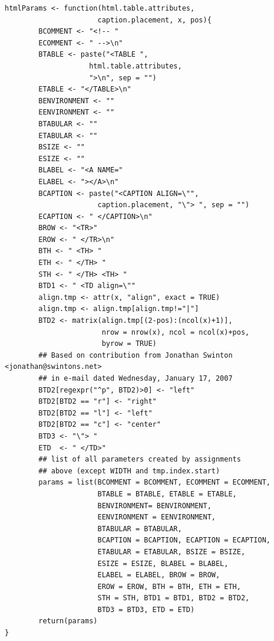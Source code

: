 \documentclass{memoir}\usepackage[]{graphicx}\usepackage[]{color}
\begin{document}
\begin{lstlisting}
htmlParams <- function(html.table.attributes, 
                      caption.placement, x, pos){
        BCOMMENT <- "<!-- "
        ECOMMENT <- " -->\n"
        BTABLE <- paste("<TABLE ", 
                    html.table.attributes, 
                    ">\n", sep = "")
        ETABLE <- "</TABLE>\n"
        BENVIRONMENT <- ""
        EENVIRONMENT <- ""
        BTABULAR <- ""
        ETABULAR <- ""
        BSIZE <- ""
        ESIZE <- ""
        BLABEL <- "<A NAME="
        ELABEL <- "></A>\n"
        BCAPTION <- paste("<CAPTION ALIGN=\"", 
                      caption.placement, "\"> ", sep = "")
        ECAPTION <- " </CAPTION>\n"
        BROW <- "<TR>"
        EROW <- " </TR>\n"
        BTH <- " <TH> "
        ETH <- " </TH> "
        STH <- " </TH> <TH> "
        BTD1 <- " <TD align=\""
        align.tmp <- attr(x, "align", exact = TRUE)
        align.tmp <- align.tmp[align.tmp!="|"]
        BTD2 <- matrix(align.tmp[(2-pos):(ncol(x)+1)],
                       nrow = nrow(x), ncol = ncol(x)+pos, 
                       byrow = TRUE)
        ## Based on contribution from Jonathan Swinton <jonathan@swintons.net>
        ## in e-mail dated Wednesday, January 17, 2007
        BTD2[regexpr("^p", BTD2)>0] <- "left"
        BTD2[BTD2 == "r"] <- "right"
        BTD2[BTD2 == "l"] <- "left"
        BTD2[BTD2 == "c"] <- "center"
        BTD3 <- "\"> "
        ETD  <- " </TD>"
        ## list of all parameters created by assignments 
        ## above (except WIDTH and tmp.index.start)
        params = list(BCOMMENT = BCOMMENT, ECOMMENT = ECOMMENT, 
                      BTABLE = BTABLE, ETABLE = ETABLE, 
                      BENVIRONMENT= BENVIRONMENT, 
                      EENVIRONMENT = EENVIRONMENT, 
                      BTABULAR = BTABULAR, 
                      BCAPTION = BCAPTION, ECAPTION = ECAPTION, 
                      ETABULAR = ETABULAR, BSIZE = BSIZE, 
                      ESIZE = ESIZE, BLABEL = BLABEL, 
                      ELABEL = ELABEL, BROW = BROW,
                      EROW = EROW, BTH = BTH, ETH = ETH,
                      STH = STH, BTD1 = BTD1, BTD2 = BTD2, 
                      BTD3 = BTD3, ETD = ETD)
        return(params)
}
\end{lstlisting}
\end{document}
